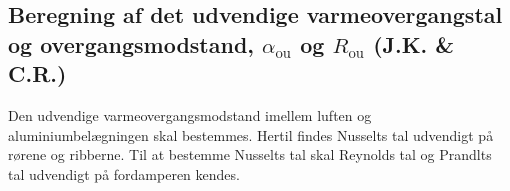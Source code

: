 \documentclass[../Hovedrapport.tex]{subfiles}
\begin{document}
\subsection{Beregning af det udvendige varmeovergangstal og overgangsmodstand, $\alpha_\text{ou}$ og $R_\text{ou}$  (J.K. \& C.R.)}
    \label{sec:Udvendig_varmeovergangsmodstand_fordamper}
Den udvendige varmeovergangsmodstand imellem luften og aluminiumbelægningen skal bestemmes. Hertil findes Nusselts tal udvendigt på rørene og ribberne. Til at bestemme Nusselts tal skal Reynolds tal og Prandlts tal udvendigt på fordamperen kendes. 
\end{document}
